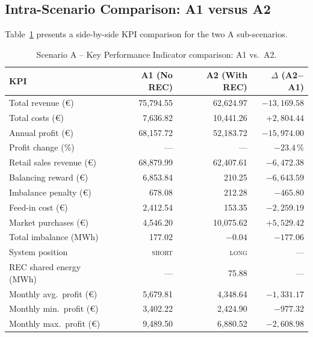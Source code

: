 \subsection{Intra-Scenario Comparison: A1 versus A2}
\label{sec:results_A_comparison}

Table~\ref{tab:A_comparison} presents a side-by-side KPI comparison for the
two A sub-scenarios.

\begin{table}[htbp]
\centering
\caption{Scenario A -- Key Performance Indicator comparison: A1 vs.\ A2.}
\label{tab:A_comparison}
\renewcommand{\arraystretch}{1.35}
\begin{tabular}{@{}lrrr@{}}
\toprule
\textbf{KPI}              & \textbf{A1 (No REC)}   & \textbf{A2 (With REC)}  & \textbf{$\Delta$ (A2$-$A1)} \\
\midrule
Total revenue (€)         & 75{,}794.55            & 62{,}624.97             & $-13{,}169.58$ \\
Total costs (€)           & 7{,}636.82             & 10{,}441.26             & $+2{,}804.44$ \\
Annual profit (€)         & 68{,}157.72            & 52{,}183.72             & $-15{,}974.00$ \\
Profit change (\%)        & ---                    & ---                     & $-23.4$\,\% \\
\addlinespace
Retail sales revenue (€)  & 68{,}879.99            & 62{,}407.61             & $-6{,}472.38$ \\
Balancing reward (€)      & 6{,}853.84             & 210.25                  & $-6{,}643.59$ \\
Imbalance penalty (€)     & 678.08                 & 212.28                  & $-465.80$ \\
Feed-in cost (€)          & 2{,}412.54             & 153.35                  & $-2{,}259.19$ \\
Market purchases (€)      & 4{,}546.20             & 10{,}075.62             & $+5{,}529.42$ \\
\addlinespace
Total imbalance (MWh)     & 177.02                 & $-0.04$                 & $-177.06$ \\
System position           & \textsc{short}         & \textsc{long}           & --- \\
REC shared energy (MWh)   & ---                    & 75.88                   & --- \\
\addlinespace
Monthly avg.\ profit (€)  & 5{,}679.81             & 4{,}348.64              & $-1{,}331.17$ \\
Monthly min.\ profit (€)  & 3{,}402.22             & 2{,}424.90              & $-977.32$ \\
Monthly max.\ profit (€)  & 9{,}489.50             & 6{,}880.52              & $-2{,}608.98$ \\
\bottomrule
\end{tabular}
\end{table}

